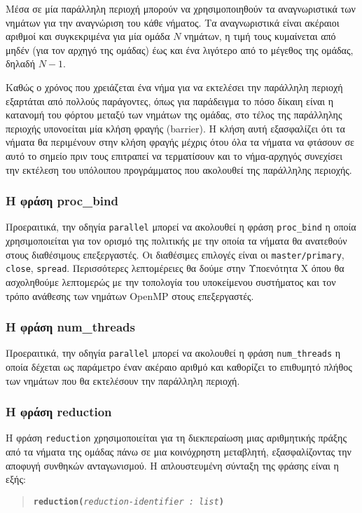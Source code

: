 Μέσα σε μία παράλληλη περιοχή μπορούν να χρησιμοποιηθούν τα αναγνωριστικά των νημάτων για την αναγνώριση του κάθε νήματος. Τα αναγνωριστικά είναι ακέραιοι αριθμοί και συγκεκριμένα για μία ομάδα $N$ νημάτων, η τιμή τους κυμαίνεται από μηδέν (για τον αρχηγό της ομάδας) έως και ένα λιγότερο από το μέγεθος της ομάδας, δηλαδή $N-1$.

Καθώς ο χρόνος που χρειάζεται ένα νήμα για να εκτελέσει την παράλληλη περιοχή εξαρτάται από πολλούς παράγοντες, όπως για παράδειγμα το πόσο δίκαιη είναι η κατανομή του φόρτου μεταξύ των νημάτων της ομάδας, στο τέλος της παράλληλης περιοχής υπονοείται μία κλήση φραγής (barrier). Η κλήση αυτή εξασφαλίζει ότι τα νήματα θα περιμένουν στην κλήση φραγής μέχρις ότου όλα τα νήματα να φτάσουν σε αυτό το σημείο πριν τους επιτραπεί να τερματίσουν και το νήμα-αρχηγός συνεχίσει την εκτέλεση του υπόλοιπου προγράμματος που ακολουθεί της παράλληλης περιοχής.

\subsubsection{Η φράση proc\_bind}
Προεραιτικά, την οδηγία \texttt{parallel} μπορεί να ακολουθεί η φράση \texttt{proc\_bind} η οποία χρησιμοποιείται για τον ορισμό της πολιτικής με την οποία τα νήματα θα ανατεθούν στους διαθέσιμους επεξεργαστές. Οι διαθέσιμες επιλογές είναι οι \texttt{master/primary}, \texttt{close}, \texttt{spread}. Περισσότερες λεπτομέρειες θα δούμε στην Υποενότητα Χ όπου θα ασχοληθούμε λεπτομερώς με την τοπολογία του υποκείμενου συστήματος και τον τρόπο ανάθεσης των νημάτων OpenMP στους επεξεργαστές.

\subsubsection{Η φράση num\_threads}
Προεραιτικά, την οδηγία \texttt{parallel} μπορεί να ακολουθεί η φράση \texttt{num\_threads} η οποία δέχεται ως παράμετρο έναν ακέραιο αριθμό και καθορίζει το επιθυμητό πλήθος των νημάτων που θα εκτελέσουν την παράλληλη περιοχή.

\subsubsection{Η φράση reduction}
Η φράση \texttt{reduction} χρησιμοποιείται για τη διεκπεραίωση μιας αριθμητικής πράξης από τα νήματα της ομάδας πάνω σε μια κοινόχρηστη μεταβλητή, εξασφαλίζοντας την αποφυγή συνθηκών ανταγωνισμού. Η απλουστευμένη σύνταξη της φράσης είναι η εξής:
\begin{quote}
	\texttt{\textbf{reduction(}\textit{reduction-identifier : list}\textbf{)}}
\end{quote}

